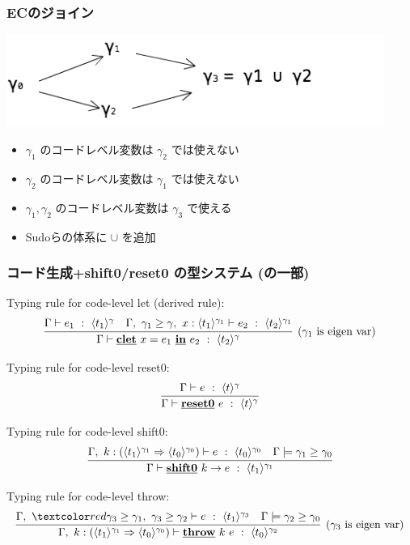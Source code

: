 \begin{frame}
  \frametitle{ECのジョイン}
  \flushleft
  \includegraphics[clip,height=3cm]{./img/ecgraph.png}
  \begin{itemize}
  \item<2-> $\gamma_1$ のコードレベル変数は $\gamma_2$ では使えない
  \item<3-> $\gamma_2$ のコードレベル変数は $\gamma_1$ では使えない
  \item<4-> $\gamma_1, \gamma_2$ のコードレベル変数は $\gamma_3$ で使える
  \item<5->[$\Rightarrow$] Sudoらの体系に $\cup$ を追加
  \end{itemize}
\end{frame}

\begin{frame}[fragile]
  \frametitle{コード生成+shift0/reset0 の型システム (の一部)}
  Typing rule for code-level let (derived rule):
  \[
    \infer[(\gamma_1~\text{is eigen var})]
    {\Gamma \vdash \clet{x}{e_1}{e_2} ~:~ \codeT{t_2}{\gamma}}
    {\Gamma \vdash e_1 ~:~ \codeT{t_1}{\gamma}
      &\Gamma,~\gamma_1 \ord \gamma,~x:\codeT{t_1}{\gamma_1} \vdash
      e_2 ~:~ \codeT{t_2}{\gamma_1}
    }
  \]

  Typing rule for code-level reset0:
  \[
    \infer{\Gamma \vdash \cresetz{e} ~:~ \codeT{t}{\gamma}}
    {\Gamma \vdash e ~:~ \codeT{t}{\gamma}}
  \]

  Typing rule for code-level shift0:
  \[
    \infer{\Gamma \vdash \cshiftz{k}{e} ~:~ \codeT{t_1}{\gamma_1}}
    {\Gamma,~k:\contT{\codeT{t_1}{\gamma_1}}{\codeT{t_0}{\gamma_0}}
      \vdash e ~:~ \codeT{t_0}{\gamma_0}
      & \Gamma \models \gamma_1 \ord \gamma_0
    }
  \]

  Typing rule for code-level throw:
  \[
    \infer[(\gamma_3~\text{is eigen var})]
    {\Gamma,~k:\contT{\codeT{t_1}{\gamma_1}}{\codeT{t_0}{\gamma_0}}
      \vdash \cthrow{k}{e} ~:~ \codeT{t_0}{\gamma_2}}
    {\Gamma,~
      \red{\gamma_3 \ord \gamma_1,~
      \gamma_3 \ord \gamma_2}
      \vdash e ~:~ \codeT{t_1}{\gamma_3}
      & \Gamma \models \gamma_2 \ord \gamma_0
    }
  \]

\end{frame}

